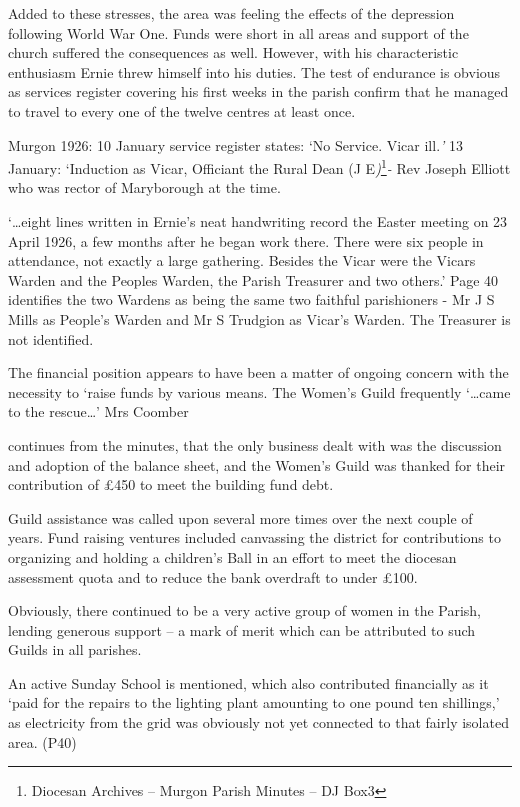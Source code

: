 Added to these stresses, the area was feeling the effects of the
depression following World War One. Funds were short in all areas and
support of the church suffered the consequences as well. However, with
his characteristic enthusiasm Ernie threw himself into his duties. The
test of endurance is obvious as services register covering his first
weeks in the parish confirm that he managed to travel to every one of
the twelve centres at least once.

Murgon 1926: 10 January service register states: `No Service. Vicar
ill.\emph{'} 13 January: `Induction as Vicar, Officiant the Rural Dean
(J E\emph{)}\footnote{Diocesan Archives -- Murgon Parish Minutes -- DJ
  Box3}\emph{-} Rev Joseph Elliott who was rector of Maryborough at the
time.

`\ldots eight lines written in Ernie's neat handwriting record the
Easter meeting on 23 April 1926, a few months after he began work there.
There were six people in attendance, not exactly a large gathering.
Besides the Vicar were the Vicars Warden and the Peoples Warden, the
Parish Treasurer and two others.' Page 40 identifies the two Wardens as
being the same two faithful parishioners - Mr J S Mills as People's
Warden and Mr S Trudgion as Vicar's Warden. The Treasurer is not
identified.

The financial position appears to have been a matter of ongoing concern
with the necessity to `raise funds by various means. The Women's Guild
frequently `\ldots came to the rescue\ldots' Mrs Coomber

continues from the minutes, that the only business dealt with was the
discussion and adoption of the balance sheet, and the Women's Guild was
thanked for their contribution of £450 to meet the building fund debt.

Guild assistance was called upon several more times over the next couple
of years. Fund raising ventures included canvassing the district for
contributions to organizing and holding a children's Ball in an effort
to meet the diocesan assessment quota and to reduce the bank overdraft
to under £100.

Obviously, there continued to be a very active group of women in the
Parish, lending generous support -- a mark of merit which can be
attributed to such Guilds in all parishes.

An active Sunday School is mentioned, which also contributed financially
as it `paid for the repairs to the lighting plant amounting to one pound
ten shillings,' as electricity from the grid was obviously not yet
connected to that fairly isolated area. (P40)

